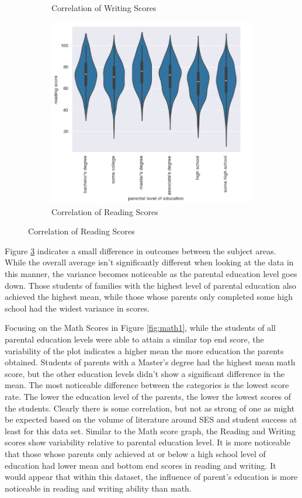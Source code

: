 \documentclass[doc]{apa6} %
\begin{document}
\begin{figure}[H]
\begin{subfigure}[b]{0.28\textwidth}
    \caption{Correlation of Writing Scores}
    \label{fig:read1}
    \end{subfigure}
    \begin{subfigure}[b]{0.28\textwidth}
    \includegraphics[width=\linewidth]{ReadingVsParent.png}
    \caption{Correlation of Reading Scores}
    \label{fig:write1}
    \end{subfigure}
    \label{fig:FirstOne}
\end{figure}

Figure \ref{fig:FirstOne} indicates a small difference in outcomes between the subject areas. While the overall average isn't significantly different when looking at the data in this manner, the variance becomes noticeable as the parental education level goes down. Those students of families with the highest level of parental education also achieved the highest mean, while those whose parents only completed some high school had the widest variance in scores.

Focusing on the Math Scores in Figure \ref{fig:math1}, while the students of all parental education levels were able to attain a similar top end score, the variability of the plot indicates a higher mean the more education the parents obtained.  Students of parents with a Master's degree had the highest mean math score, but the other education levels didn't show a significant difference in the mean.  The most noticeable difference between the categories is the lowest score rate. The lower the education level of the parents, the lower the lowest scores of the students.  Clearly there is some correlation, but not as strong of one as might be expected based on the volume of literature around SES and student success at least for this data set.
Similar to the Math score graph, the Reading and Writing scores show variability relative to parental education level.  It is more noticeable that those whose parents only achieved at or below a high school level of education had lower mean and bottom end scores in reading and writing. It would appear that within this dataset, the influence of parent's education is more noticeable in reading and writing ability than math.
\end{document}
